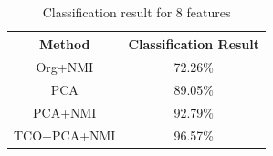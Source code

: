\documentclass[document.tex]{subfiles}
\begin{document}
\begin{table}[H]
	\caption{Classification result for 8 features}
	\begin{center}
		\begin{tabular}{|c|c|}
			\hline
			Method & Classification Result\\ \hline
			Org+NMI & 72.26\%\\ \hline
			PCA & 89.05\%\\ \hline
			PCA+NMI & 92.79\%\\ \hline
			TCO+PCA+NMI & 96.57\%\\ \hline
		\end{tabular}
	\end{center}
	\label{tab:Classification result for 8 features}
\end{table}

\end{document}
